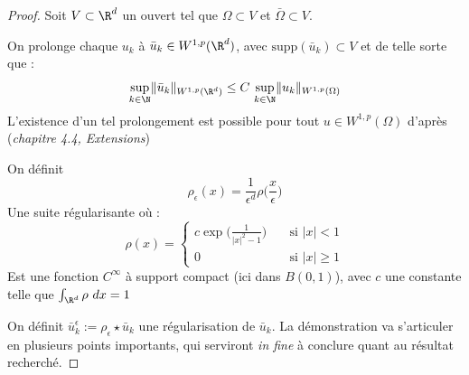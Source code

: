 \begin{proof}
    Soit $V \subset \R^d$ un ouvert tel que $\Omega \subset V$ et $\bar{\Omega} \subset V$.

    On prolonge chaque $u_k$ à $\bar{u}_k \in W^{1,p}(\R^d)$, avec $\text{supp}(\bar{u}_k) \subset V$ et de telle sorte que :
    $$\underset{k \in \N}{\sup} \|\bar{u}_k\|_{W^{1,p}(\R^d)} \leq C \ \underset{k \in \N}{\sup}\|u_k\|_{W^{1,p}(\Omega)}$$
    L'existence d'un tel prolongement est possible pour tout $u \in W^{1,p}(\Omega)$ d'après \cite{Evans} (\textit{chapitre 4.4, Extensions})

    On définit 
    $$\rho_{\epsilon}(x) = \frac{1}{\epsilon^d} \rho\Big(\frac{x}{\epsilon}\Big) $$ 
    Une suite régularisante où :
    $$\rho(x) = 
    \begin{cases}
        c \exp \Big(\frac{1}{|x|^2 - 1}\Big) \quad &\text{si } |x| < 1 \\
        0 &\text{si } |x| \geq 1
    \end{cases}$$
    Est une fonction $C^{\infty}$ à support compact (ici dans $B(0,1)$), avec $c$ une constante telle que $\int_{\R^d} \rho \ dx = 1$

    On définit $\bar{u}_k^{\epsilon} := \rho_{\epsilon} \star \bar{u}_k $ une régularisation de $\bar{u}_k$. La démonstration va s'articuler en 
    plusieurs points importants, qui serviront \textit{in fine} à conclure quant au résultat recherché.


\end{proof}
